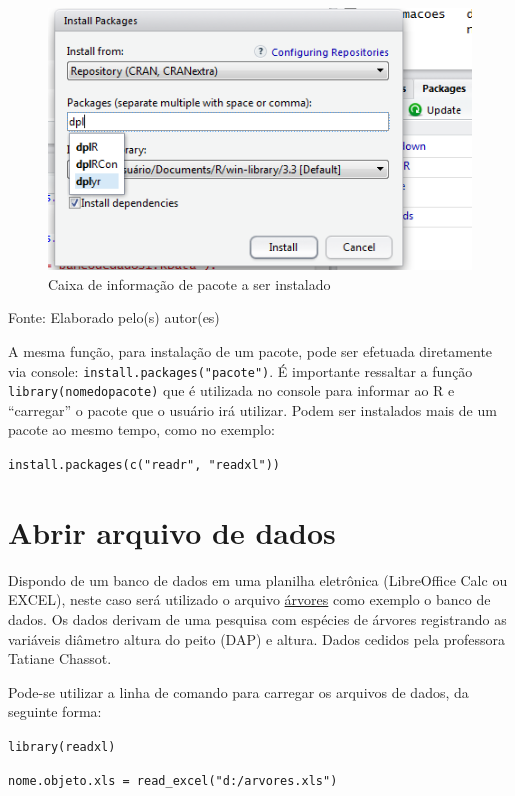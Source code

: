 \documentclass[12pt,portuguese,oneside]{book}
\begin{document}
\begin{figure}[H]

{\centering \includegraphics[width=0.8\linewidth]{pacotes2} 

}

\caption{Caixa de informação de pacote a ser instalado}\label{fig:pacotes2}
\end{figure}

Fonte: Elaborado pelo(s) autor(es)

A mesma função, para instalação de um pacote, pode ser efetuada
diretamente via console: \texttt{install.packages("pacote")}. É
importante ressaltar a função \texttt{library(nomedopacote)} que é
utilizada no console para informar ao R e ``carregar'' o pacote que o
usuário irá utilizar. Podem ser instalados mais de um pacote ao mesmo
tempo, como no exemplo:

\texttt{install.packages(c("readr",\ "readxl"))}

\section{Abrir arquivo de dados}\label{abrir-arquivo-de-dados}

Dispondo de um banco de dados em uma planilha eletrônica (LibreOffice
Calc ou EXCEL), neste caso será utilizado o arquivo
\href{https://github.com/Smolski/softwarelivrer/raw/master/basico/arvores.xlsx}{árvores}
como exemplo o banco de dados. Os dados derivam de uma pesquisa com
espécies de árvores registrando as variáveis diâmetro altura do peito
(DAP) e altura. Dados cedidos pela professora Tatiane Chassot.

Pode-se utilizar a linha de comando para carregar os arquivos de dados,
da seguinte forma:

\texttt{library(readxl)}

\texttt{nome.objeto.xls\ =\ read\_excel("d:/arvores.xls")}
\end{document}
